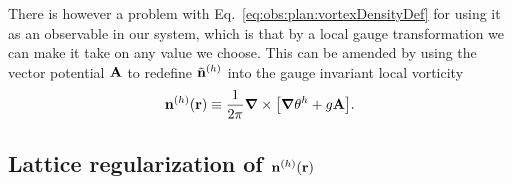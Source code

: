 There is however a problem with Eq.~\eqref{eq:obs:plan:vortexDensityDef} for using it as an
observable in our system, which is that by a local gauge transformation we can make it take on
any value we choose. This can be amended by using the vector potential ${\boldsymbol{\mathbf{A}}}$ to redefine
$\tilde{{\boldsymbol{\mathbf{n}}}}^{(h)}$ into the gauge invariant local vorticity \cite{Smorgrav05}
\begin{equation}
  {\ensuremath{\boldsymbol{\mathbf{n}}}}^{(h)}({\boldsymbol{\mathbf{r}}}) \equiv \frac{1}{2\pi}{\boldsymbol{\mathbf{\nabla}}}\times\big[{\boldsymbol{\mathbf{\nabla}}}\theta^h + g{\boldsymbol{\mathbf{A}}}\big].
  \label{eq:obs:plan:gaugeInvariantLocalVorticity}
\end{equation}

\subsection{Lattice regularization of ${\boldsymbol{\mathbf{n}}}^{(h)}({\boldsymbol{\mathbf{r}}})$}

